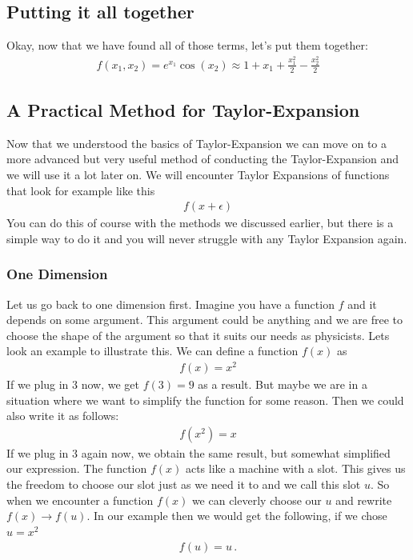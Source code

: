 \documentclass{article}
\begin{document}
	\subsection*{Putting it all together}
	Okay, now that we have found all of those terms, let's put them together:
	\begin{align}
		f(x_1, x_2)=e^{x_1} \cos(x_2)  \approx 1+ x_1+ \frac{x_1^2}{2}-\frac{x_2^2}{2} 
	\end{align}
	
	\subsection{A Practical Method for Taylor-Expansion}
	
	Now that we understood the basics of Taylor-Expansion we can move on to a more
	advanced but very useful method of conducting the Taylor-Expansion and we will
	use it a lot later on. We will encounter Taylor Expansions of functions that look for example like this
	\begin{align}
		f(x+\epsilon)
	\end{align}
	You can do this of course with the methods we discussed earlier, but there is a simple way to do it and you will never struggle with any Taylor Expansion again.
	
	\subsubsection*{One Dimension}
	
	Let us go back to one dimension first.  Imagine you have a function $f$ and it depends on some argument. This argument could be anything and we are free to choose the shape of the argument so that it suits our needs as physicists. Lets look an example to illustrate this.
	We can define a function $f(x)$ as
	\begin{align}
		f(x) = x^2
	\end{align}
	If we plug in $3$ now, we get $f(3)=9$ as a result.
	But maybe we are in a situation where we want to simplify the function for some reason. Then we could also write it as follows:
	\begin{align}
		f(x^2)=x
	\end{align}
	If we plug in $3$ again now, we obtain the same result, but somewhat simplified our expression. 
	The function $f(x)$ acts like a machine with a slot. This gives us the freedom to choose our slot just as we need it to and we call this slot $u$. So when we encounter a function $f(x)$ we can cleverly choose our $u$ and rewrite $f(x)\rightarrow f(u)$.
	In our example then we would get the following, if we chose $u=x^2$
	\begin{align}
		f(u)=u\,.
	\end{align}
	
\end{document}
